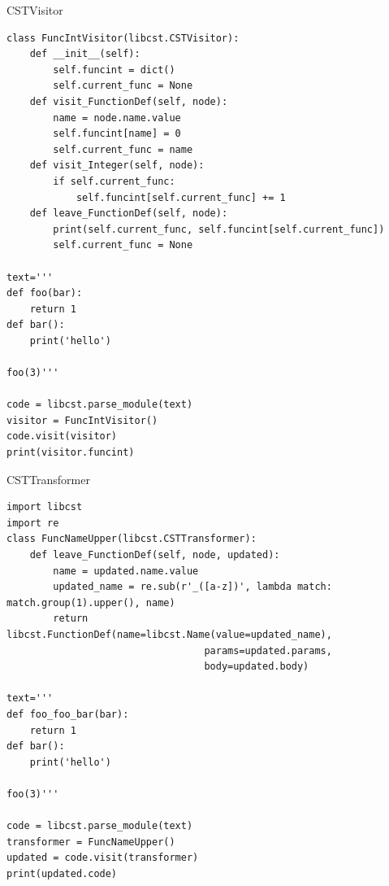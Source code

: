 \documentclass{beamer}
\let\oldfootnotesize\footnotesize
\renewcommand*{\footnotesize}{\oldfootnotesize\tiny}
\begin{document}
\begin{frame}[t,fragile]{CSTVisitor}
\footnotesize
\begin{verbatim}
class FuncIntVisitor(libcst.CSTVisitor):
    def __init__(self):
        self.funcint = dict()
        self.current_func = None
    def visit_FunctionDef(self, node):
        name = node.name.value
        self.funcint[name] = 0
        self.current_func = name
    def visit_Integer(self, node):
        if self.current_func:
            self.funcint[self.current_func] += 1
    def leave_FunctionDef(self, node):
        print(self.current_func, self.funcint[self.current_func])
        self.current_func = None

text='''
def foo(bar):
    return 1
def bar():
    print('hello')

foo(3)'''

code = libcst.parse_module(text)
visitor = FuncIntVisitor()
code.visit(visitor)
print(visitor.funcint)
\end{verbatim}
\end{frame}
\begin{frame}[t,fragile]{CSTTransformer}
\footnotesize
\begin{verbatim}
import libcst
import re
class FuncNameUpper(libcst.CSTTransformer):
    def leave_FunctionDef(self, node, updated):
        name = updated.name.value
        updated_name = re.sub(r'_([a-z])', lambda match: match.group(1).upper(), name)
        return libcst.FunctionDef(name=libcst.Name(value=updated_name), 
                                  params=updated.params, 
                                  body=updated.body)

text='''
def foo_foo_bar(bar):
    return 1
def bar():
    print('hello')

foo(3)'''

code = libcst.parse_module(text)
transformer = FuncNameUpper()
updated = code.visit(transformer)
print(updated.code)

\end{verbatim}
    
\end{frame}
\end{document}
